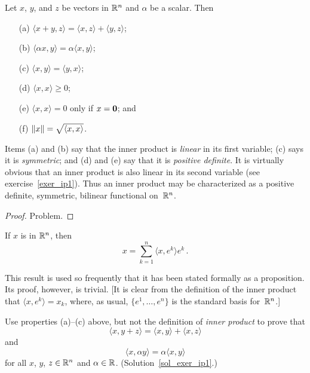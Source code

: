 \begin{prop}\label{prop_prop_ip} Let $x$, $y$, and $z$ be vectors in $\mathbb{R}^n$ and $\alpha$ be a
scalar.  Then
 \begin{enumerate}
  \item[(a)] $\langle x + y , z \rangle = \langle x , z \rangle + \langle y , z \rangle$;
  \item[(b)] $\langle \alpha x , y \rangle = \alpha \langle x , y \rangle$;
  \item[(c)] $\langle x , y \rangle = \langle y , x \rangle$;
  \item[(d)] $\langle x , x \rangle \ge 0$;
  \item[(e)] $\langle x , x \rangle = 0$ only if $x = \mathbf{0}$; and
  \item[(f)] $\lVert x\rVert = \sqrt{\langle x , x \rangle} $.
 \end{enumerate}
Items (a) and (b) say that the inner product is
\emph{linear} in its first variable; (c) says it is
\emph{symmetric}; and (d) and (e) say that it is
\emph{positive definite}.  It is virtually obvious that an inner product is also linear in its
second variable (see exercise~\ref{exer_ip1}).  Thus an inner product may be characterized as
a positive definite, symmetric, bilinear functional on~$\mathbb{R}^n$.
\end{prop}

\begin{proof} Problem.   \ns  \end{proof}

\begin{prop}\label{prop_ip_expan} If $x$ is in $\mathbb{R}^n$, then
  \[ x = \sum_{k=1}^n \langle x , e^k \rangle e^k \,. \]
\end{prop}

This result is used so frequently that it has been stated formally as a proposition.  Its
proof, however, is trivial. [It is clear from the definition of the inner product that
$\langle x , e^k \rangle = x_k$, where, as usual, $\{e^1, \dots, e^n\}$ is the standard basis
for~$\mathbb{R}^n$.]

\begin{exer}\label{exer_ip1}  Use properties (a)--(c) above, but not the definition of
\emph{inner product} to prove that
  \[ \langle x , y + z \rangle =  \langle x , y \rangle + \langle x , z \rangle \]
and
  \[ \langle x , \alpha y \rangle = \alpha \langle x , y \rangle \]
for all $x$, $y$, $z \in \mathbb{R}^n$ and $\alpha \in \mathbb{R}$. (Solution~\ref{sol_exer_ip1}.)
\end{exer}

